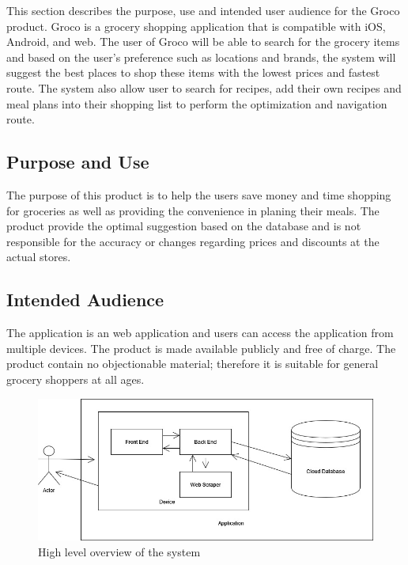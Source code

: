 This section describes the purpose, use and intended user audience for the Groco product. Groco is a grocery shopping application that is compatible with iOS, Android, and web. The user of Groco will be able to search for the grocery items and based on the user's preference such as locations and brands, the system will suggest the best places to shop these items with the lowest prices and fastest route. The system also allow user to search for recipes, add their own recipes and meal plans into their shopping list to perform the optimization and navigation route. 

\subsection{Purpose and Use}
The purpose of this product is to help the users save money and time shopping for groceries as well as providing the convenience in planing their meals. The product provide the optimal suggestion based on the database and is not responsible for the accuracy or changes regarding prices and discounts at the actual stores.  

\subsection{Intended Audience}
The application is an web application and users can access the application from multiple devices. The product is made available publicly and free of charge. The product contain no objectionable material; therefore it is suitable for general grocery shoppers at all ages.

\begin{figure}[h!]
	\centering
   	\includegraphics[width=1\textwidth]{images/system_diagram.jpg}
    \caption{High level overview of the system}
\end{figure}
